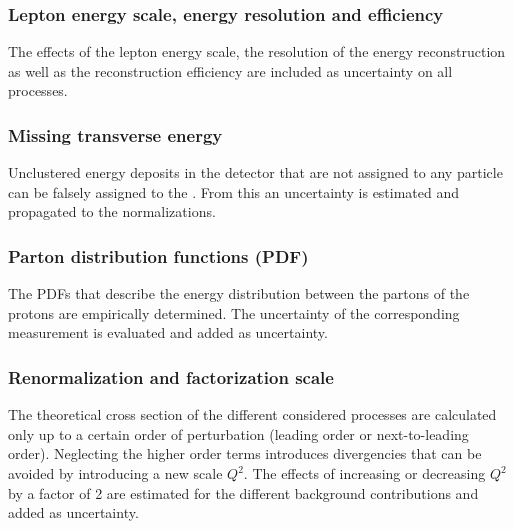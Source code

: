 \subsubsection*{Lepton energy scale, energy resolution and efficiency}
The effects of the lepton energy scale, the resolution of the energy reconstruction as well as the reconstruction efficiency are included as uncertainty on all processes.
\subsubsection*{Missing transverse energy}
Unclustered energy deposits in the detector that are not assigned to any particle can be falsely assigned to the \MET . From this an uncertainty is estimated and propagated to the normalizations. 
\subsubsection*{Parton distribution functions (PDF)}
The PDFs that describe the energy distribution between the partons of the protons are empirically determined. The uncertainty of the corresponding measurement is evaluated and added as uncertainty.
\subsubsection*{Renormalization and factorization scale}
The theoretical cross section of the different considered processes are calculated only up to a certain order of perturbation (leading order or next-to-leading order). Neglecting the higher order terms introduces divergencies that can be avoided by introducing a new scale $Q^2$. The effects of increasing or decreasing $Q^2$ by a factor of 2 are estimated for the different background contributions and added as uncertainty. 

